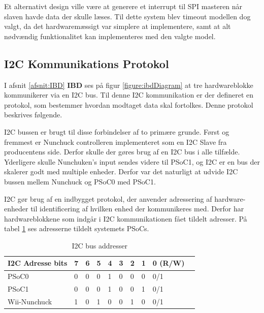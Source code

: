 Et alternativt design ville være at generere et interrupt til SPI masteren når slaven havde data der skulle læses. Til dette system blev timeout modellen dog valgt, da det hardwaremæssigt var simplere at implementere, samt at alt nødvændig funktionalitet kan implementeres med den valgte model.

\subsection{I2C Kommunikations Protokol}
\label{afsnit:I2CProtokol}
I afsnit \ref{afsnit:IBD} \textbf{IBD} ses på figur \ref{figure:ibdDiagram} at tre hardwareblokke kommunikerer via en I2C bus. Til denne I2C kommunikation er der defineret en protokol, som bestemmer hvordan modtaget data skal fortolkes. Denne protokol beskrives følgende.

I2C bussen er brugt til disse forbindelser af to primære grunde. Først og fremmest er Nunchuck controlleren implementeret som en I2C Slave fra producentens side. Derfor skulle der gøres brug af en I2C bus i alle tilfælde. Yderligere skulle Nunchuken's input sendes videre til PSoC1, og I2C er en bus der skalerer godt med multiple enheder. Derfor var det naturligt at udvide I2C bussen mellem Nunchuck og PSoC0 med PSoC1.

I2C gør brug af en indbygget protokol, der anvender adressering af hardware-enheder til identificering af hvilken enhed der kommunikeres med. Derfor har hardwareblokkene som indgår i I2C kommunikationen fået tildelt adresser. På tabel \ref{table:I2CAddress} ses adresserne tildelt systemets PSoCs.

\begin{table}[H]
	\centering
	\begin{tabular}{llllllllll}
		\hline
		\multicolumn{1}{|l|}{I2C Adresse bits} & 7                        & 6                        & 5                        & 4 & 3 & 2 & \multicolumn{1}{l|}{1} & \multicolumn{1}{l|}{0 (R/W)} \\ \hline
		\rowcolor[HTML]{CBCEFB} 
		{\color[HTML]{000000} PSoC0}           & {\color[HTML]{000000} 0} & {\color[HTML]{000000} 0} & {\color[HTML]{000000} 0} & 1 & 0 & 0 & 0                      & 0/1                          \\
		PSoC1                                  & 0                        & 0                        & 0                        & 1 & 0 & 0 & 1                      & 0/1 \\
		\rowcolor[HTML]{CBCEFB} 
		{\color[HTML]{000000} Wii-Nunchuck}           & {\color[HTML]{000000} 1} & {\color[HTML]{000000} 0} & {\color[HTML]{000000} 1} & 0 & 0 & 1 & 0                      & 0/1                      
	\end{tabular}
	\caption{I2C bus addresser}
	\label{table:I2CAddress}
\end{table}

